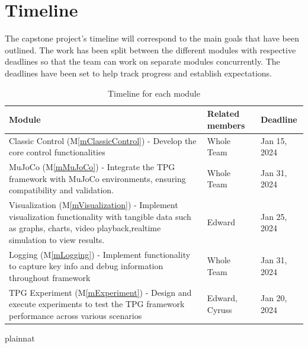 \documentclass[12pt, titlepage]{article}
\newcommand{\mref}[1]{M\ref{#1}}
\begin{document}





\section{Timeline}

The capstone project's timeline will correspond to the main goals that have been outlined. The work has been split between the different modules with respective deadlines so that the team can work on separate modules concurrently. The deadlines have been set to help track progress and establish expectations. 

\begin{center}
    \begin{table}
    \centering
    \begin{tabular}{p{} p{} p{}}


         \textbf{Module}&  \textbf{Related members}& \textbf{Deadline}\\ \hline 
         Classic Control (\mref{mClassicControl}) - Develop the core control functionalities&  Whole Team & Jan 15, 2024\\ \hline 
         MuJoCo (\mref{mMuJoCo}) - Integrate the TPG framework with MuJoCo environments, ensuring compatibility and validation.&  Whole Team & Jan 31, 2024\\ \hline 
         Visualization (\mref{mVisualization}) - Implement visualization functionality with tangible data such as 
        graphs, charts, video playback,realtime simulation to view results.
         &  Edward & Jan 25, 2024\\ \hline 
         Logging (\mref{mLogging}) - Implement functionality to capture key info and debug information throughout framework &   Whole Team & Jan 31, 2024\\ \hline 
         TPG Experiment (\mref{mExperiment}) - Design and execute experiments to test the TPG framework performance across various scenarios& Edward, Cyruss & Jan 20, 2024\\ \hline 
    \end{tabular}
    \caption{Timeline for each module}
    \label{tab:my_label}
\end{table}
\end{center}

 {plainnat}


\newpage{}
\end{document}
